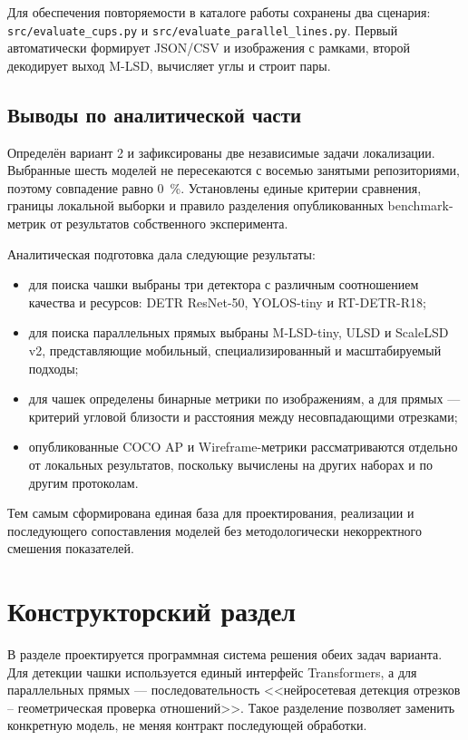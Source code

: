 \documentclass[a4paper,12pt]{extreport}
\newcommand{\code}[1]{\nolinkurl{#1}}
\begin{document}
Для обеспечения повторяемости в каталоге работы сохранены два сценария: \code{src/evaluate_cups.py} и \code{src/evaluate_parallel_lines.py}. Первый автоматически формирует JSON/CSV и изображения с рамками, второй декодирует выход M-LSD, вычисляет углы и строит пары.

\section{Выводы по аналитической части}

Определён вариант 2 и зафиксированы две независимые задачи локализации. Выбранные шесть моделей не пересекаются с восемью занятыми репозиториями, поэтому совпадение равно 0~\%. Установлены единые критерии сравнения, границы локальной выборки и правило разделения опубликованных benchmark-метрик от результатов собственного эксперимента.

Аналитическая подготовка дала следующие результаты:
\begin{itemize}
\item для поиска чашки выбраны три детектора с различным соотношением качества и ресурсов: DETR ResNet-50, YOLOS-tiny и RT-DETR-R18;
\item для поиска параллельных прямых выбраны M-LSD-tiny, ULSD и ScaleLSD v2, представляющие мобильный, специализированный и масштабируемый подходы;
\item для чашек определены бинарные метрики по изображениям, а для прямых --- критерий угловой близости и расстояния между несовпадающими отрезками;
\item опубликованные COCO AP и Wireframe-метрики рассматриваются отдельно от локальных результатов, поскольку вычислены на других наборах и по другим протоколам.
\end{itemize}

Тем самым сформирована единая база для проектирования, реализации и последующего сопоставления моделей без методологически некорректного смешения показателей.

\chapter{Конструкторский раздел}

В разделе проектируется программная система решения обеих задач варианта. Для детекции чашки используется единый интерфейс Transformers, а для параллельных прямых --- последовательность <<нейросетевая детекция отрезков -- геометрическая проверка отношений>>. Такое разделение позволяет заменить конкретную модель, не меняя контракт последующей обработки.
\end{document}

